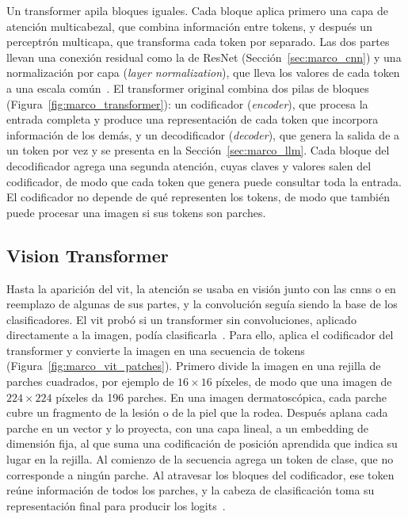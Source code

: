 Un transformer apila bloques iguales. Cada bloque aplica primero una capa de atención multicabezal, que combina
información entre tokens, y después un perceptrón multicapa, que transforma cada token por
separado. Las dos partes llevan una conexión residual como la de ResNet (Sección~\ref{sec:marco_cnn}) y una
normalización por capa (\emph{layer normalization}), que lleva los valores de cada token a una escala
común~\cite{vaswani2017attention}. El transformer original combina dos pilas de bloques
(Figura~\ref{fig:marco_transformer}): un codificador (\emph{encoder}), que procesa la entrada completa y produce
una representación de cada token que incorpora información de los demás, y un decodificador (\emph{decoder}), que
genera la salida de a un token por vez y se presenta en la Sección~\ref{sec:marco_llm}. Cada bloque del
decodificador agrega una segunda atención, cuyas claves y valores salen del codificador, de modo que cada token
que genera puede consultar toda la entrada. El codificador no depende de qué representen los tokens, de modo que
también puede procesar una imagen si sus tokens son parches.



\subsection{Vision Transformer}
\label{sec:marco_vit}

Hasta la aparición del \gls{vit}, la atención se usaba en visión junto con las \glspl{cnn} o en reemplazo de
algunas de sus partes, y la convolución seguía siendo la base de los clasificadores. El \gls{vit} probó si un
transformer sin convoluciones, aplicado directamente a la imagen, podía clasificarla~\cite{dosovitskiy2021image}.
Para ello, aplica el codificador del transformer y convierte la imagen en una secuencia de tokens
(Figura~\ref{fig:marco_vit_patches}). Primero divide la imagen en una
rejilla de parches cuadrados, por ejemplo de $16 \times 16$ píxeles, de modo que una imagen de
$224 \times 224$ píxeles da 196 parches. En una imagen dermatoscópica, cada parche cubre un fragmento de la
lesión o de la piel que la rodea. Después aplana cada parche en un vector y lo proyecta, con una capa
lineal, a un embedding de dimensión fija, al que suma una codificación de posición aprendida que indica
su lugar en la rejilla. Al comienzo de la secuencia agrega un token de clase, que no corresponde a ningún
parche. Al atravesar los bloques del codificador, ese token reúne información de todos los parches, y la
cabeza de clasificación toma su representación final para producir los
logits~\cite{dosovitskiy2021image}.


